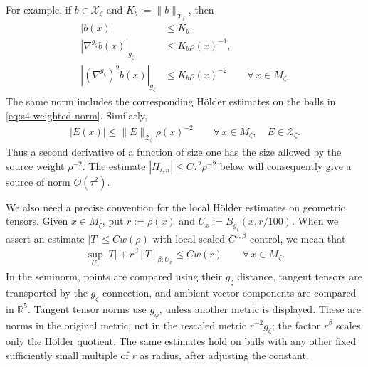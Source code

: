 \documentclass[a4paper,11pt,oneside,reqno]{amsart}
\numberwithin{equation}{section}
\theoremstyle{definition}
\begin{document}
For example, if $b\in\mathcal X_\zeta$ and
$K_b:=\|b\|_{\mathcal X_\zeta}$, then
%
\begin{align*}
    |b(x)|&\leq K_b,\\
    |\nabla^{g_\zeta}b(x)|_{g_\zeta}
      &\leq K_b\rho(x)^{-1},\\
    |(\nabla^{g_\zeta})^2b(x)|_{g_\zeta}
      &\leq K_b\rho(x)^{-2}
      \qquad\forall\,x\in M_\zeta.
\end{align*}
%
The same norm includes the corresponding H\"older
estimates on the balls in \eqref{eq:s4-weighted-norm}.
Similarly,
%
\begin{align*}
    |E(x)|\leq\|E\|_{\mathcal Z_\zeta}\rho(x)^{-2}
    \qquad\forall\,x\in M_\zeta,
    \quad E\in\mathcal Z_\zeta.
\end{align*}
%
Thus a second derivative of a function of size one has
the size allowed by the source weight $\rho^{-2}$.
The estimate $|H_{\iota,n}|\leq C\tau^2\rho^{-2}$ below
will consequently give a source of norm $O(\tau^2)$.

We also need a precise convention for the local H\"older
estimates on geometric tensors. Given $x\in M_\zeta$,
put $r:=\rho(x)$ and
$U_x:=B_{g_\zeta}(x,r/100)$. When we assert an estimate
$|T|\leq Cw(\rho)$ with local scaled $C^{0,\beta}$
control, we mean that
%
\begin{align*}
    \sup_{U_x}|T|+r^\beta[T]_{\beta;U_x}
        \leq Cw(r)
        \qquad\forall\,x\in M_\zeta.
\end{align*}
%
In the seminorm, points are compared using their
$g_\zeta$ distance, tangent tensors are transported by
the $g_\zeta$ connection, and ambient vector components
are compared in $\mathbb R^5$. Tangent tensor norms use
$g_\phi$, unless another metric is displayed. These are
norms in the original metric, not in the rescaled metric
$r^{-2}g_\zeta$; the factor $r^\beta$ scales only the
H\"older quotient. The same estimates hold on balls with
any other fixed sufficiently small multiple of $r$ as
radius, after adjusting the constant.
\end{document}
